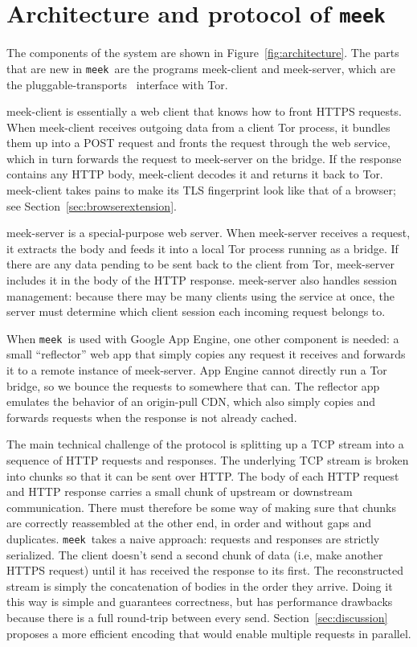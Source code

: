\documentclass[conference]{IEEEtran}
\newcommand{\meekclient}{\mbox{meek-client}\xspace}
\newcommand{\meekserver}{\mbox{meek-server}\xspace}
\newcommand{\meek}{\texttt{meek}\xspace}
\begin{document}
\section{Architecture and protocol of \meek}
\label{sec:architecture}

The components of the system are shown in Figure~\ref{fig:architecture}.
The parts that are new in \meek\
are the programs \meekclient and \meekserver,
which are the pluggable-transports~\cite{pt} interface with Tor.

\meekclient is essentially a web client that knows how to front HTTPS requests.
When \meekclient receives outgoing data from a client Tor process, it bundles them up into a POST request
and fronts the request through the web service,
which in turn forwards the request to \meekserver on the bridge.
If the response contains any HTTP body, \meekclient decodes it and returns it back to Tor.
\meekclient takes pains to make its TLS fingerprint
look like that of a browser; see Section~\ref{sec:browserextension}.

\meekserver is a special-purpose web server.
When \meekserver receives a request, it extracts the body and feeds it into
a local Tor process running as a bridge.
If there are any data pending to be sent back to the client from Tor,
\meekserver includes it in the body of the HTTP response.
\meekserver also handles session management:
because there may be many clients using the service at once,
the server must determine which client session each incoming request belongs to.

When \meek\ is used with Google App Engine, one other component is needed:
a small ``reflector'' web app that simply copies any request
it receives and forwards it to a remote instance of \meekserver.
App Engine cannot directly run a Tor bridge,
so we bounce the requests to somewhere that can.
The reflector app emulates the behavior of an origin-pull CDN,
which also simply copies and forwards requests
when the response is not already cached.

The main technical challenge of the protocol is splitting up a TCP stream
into a sequence of HTTP requests and responses.
The underlying TCP stream is broken into chunks so that
it can be sent over HTTP.
The body of each HTTP request and HTTP response carries
a small chunk of upstream or downstream communication.
There must therefore be some way of making sure that chunks
are correctly reassembled at the other end,
in order and without gaps and duplicates.
\meek\ takes a naive approach: requests and responses are strictly serialized.
The client doesn't send a second chunk of data
(i.e, make another HTTPS request) until it has
received the response to its first.
The reconstructed stream is simply the concatenation
of bodies in the order they arrive.
Doing it this way is simple and guarantees correctness,
but has performance drawbacks because there is a full round-trip
between every send.
Section~\ref{sec:discussion} proposes a more efficient encoding
that would enable multiple requests in parallel.
\end{document}
